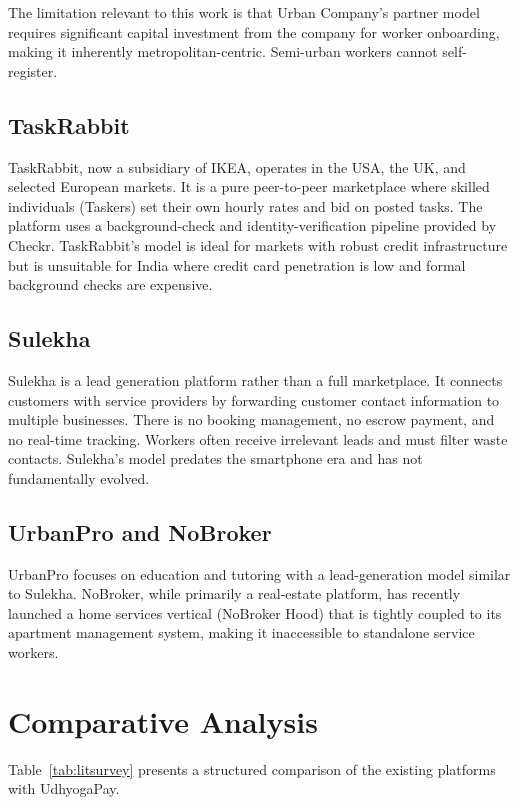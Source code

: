 \documentclass[12pt,a4paper]{report}
\begin{document}
The limitation relevant to this work is that Urban Company's partner model requires significant capital investment from the company for worker onboarding, making it inherently metropolitan-centric. Semi-urban workers cannot self-register.

\subsection{TaskRabbit}

TaskRabbit, now a subsidiary of IKEA, operates in the USA, the UK, and selected European markets. It is a pure peer-to-peer marketplace where skilled individuals (Taskers) set their own hourly rates and bid on posted tasks. The platform uses a background-check and identity-verification pipeline provided by Checkr. TaskRabbit's model is ideal for markets with robust credit infrastructure but is unsuitable for India where credit card penetration is low and formal background checks are expensive.

\subsection{Sulekha}

Sulekha is a lead generation platform rather than a full marketplace. It connects customers with service providers by forwarding customer contact information to multiple businesses. There is no booking management, no escrow payment, and no real-time tracking. Workers often receive irrelevant leads and must filter waste contacts. Sulekha's model predates the smartphone era and has not fundamentally evolved.

\subsection{UrbanPro and NoBroker}

UrbanPro focuses on education and tutoring with a lead-generation model similar to Sulekha. NoBroker, while primarily a real-estate platform, has recently launched a home services vertical (NoBroker Hood) that is tightly coupled to its apartment management system, making it inaccessible to standalone service workers.

\section{Comparative Analysis}

Table~\ref{tab:litsurvey} presents a structured comparison of the existing platforms with UdhyogaPay.
\end{document}

